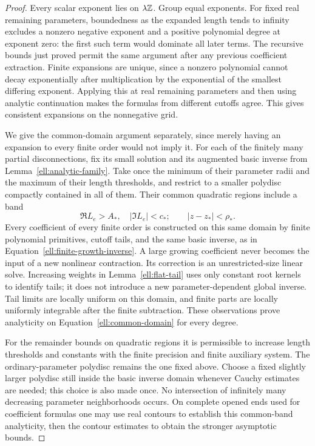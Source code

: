 \begin{proof}
Every scalar exponent lies on $\lambda\mathbb{Z}$. Group equal exponents.
For fixed real remaining parameters, boundedness as the expanded
length tends to infinity excludes a nonzero negative exponent and
a positive polynomial degree at exponent zero: the first such term
would dominate all later terms. The recursive bounds just proved
permit the same argument after any previous coefficient extraction.
Finite expansions are unique, since a nonzero polynomial cannot
decay exponentially after multiplication by the exponential of the
smallest differing exponent. Applying this at real remaining
parameters and then using analytic continuation makes the formulas
from different cutoffs agree. This gives consistent expansions on
the nonnegative grid.

We give the common-domain argument separately, since merely
having an expansion to every finite order would not imply it.
For each of the finitely many partial disconnections, fix its
small solution and its augmented basic inverse from
Lemma~\ref{ell:analytic-family}.  Take once the minimum of
their parameter radii and the maximum of their length thresholds,
and restrict to
a smaller polydisc compactly contained in all of them.
Their common quadratic regions include a band
\begin{equation}
 \Re L_e>A_*,\quad |\Im L_e|<c_*;
 \qquad |z-z_*|<\rho_*.
 \label{ell:common-domain}
\end{equation}
Every coefficient of every finite order is constructed on
this same domain by finite polynomial primitives, cutoff
tails, and the same basic inverse, as in
Equation~\eqref{ell:finite-growth-inverse}.  A large growing
coefficient never becomes the input of a new nonlinear
contraction.  Its correction is an unrestricted-size linear
solve.  Increasing weights in Lemma~\ref{ell:flat-tail} uses
only constant root kernels to identify tails; it does not
introduce a new parameter-dependent global inverse.  Tail
limits are locally uniform on this domain, and finite parts
are locally uniformly integrable after the finite subtraction.
These observations prove analyticity on
Equation~\eqref{ell:common-domain} for every degree.

For the remainder bounds on quadratic regions it is permissible
to increase length thresholds and constants with the finite
precision and finite auxiliary system.  The ordinary-parameter
polydisc remains the one fixed above.  Choose a fixed slightly
larger polydisc still inside the basic inverse domain whenever
Cauchy estimates are needed; this choice is also made once.
No intersection of infinitely many decreasing parameter
neighborhoods occurs.  On complete opened ends used for
coefficient formulas one may use real contours to establish
this common-band analyticity, then the contour estimates to
obtain the stronger asymptotic bounds.


\end{proof}
